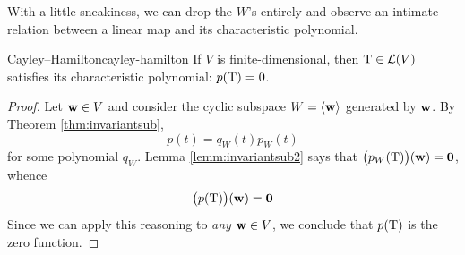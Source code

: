 With a little sneakiness, we can drop the $W$'s entirely and observe an intimate relation between a linear map and its characteristic polynomial.

\begin{thm}{Cayley--Hamilton}{cayley-hamilton}
	If $V$ is finite-dimensional, then $\mathrm{T}\in\mathcal{L}(V)$ satisfies its characteristic polynomial: $p(\mathrm{T})=0$. 
\end{thm}

\begin{proof}
	Let ${\mathbf{w}}\in V$ and consider the cyclic subspace $W=\left\langle {\mathbf{w}}\right\rangle$ generated by ${\mathbf{w}}$. By 
	Theorem \ref{thm:invariantsub},
	\[
		p(t)=q_{W}(t)p_{W}(t)
	\]
	for some polynomial $q_{W}$. Lemma \ref{lemm:invariantsub2} says that $\big(p_{W}(\mathrm{T})\big)({\mathbf{w}})=\mathbf{0}$, whence
	\[
		\big(p(\mathrm{T})\big)({\mathbf{w}})=\mathbf{0}
	\]
	Since we can apply this reasoning to \emph{any} ${\mathbf{w}}\in V$, we conclude that $p(\mathrm{T})$ is the zero function.
\end{proof}


